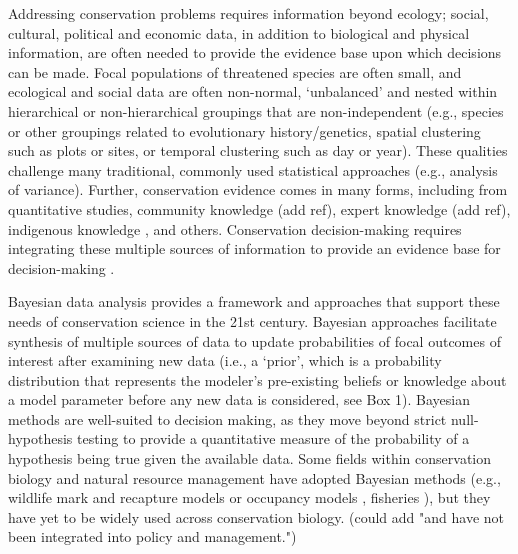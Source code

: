 \documentclass{article}
\begin{document}
\par Addressing conservation problems requires information beyond ecology; social, cultural, political and economic data, in addition to biological and physical information, are often needed to provide the evidence base upon which decisions can be made. Focal populations of threatened species are often small, and ecological and social data are often non-normal, `unbalanced' and nested within hierarchical or non-hierarchical groupings that are non-independent (e.g., species or other groupings related to evolutionary history/genetics, spatial clustering such as plots or sites, or temporal clustering such as day or year). These qualities challenge many traditional, commonly used statistical approaches (e.g., analysis of variance). Further, conservation evidence comes in many forms, including from quantitative studies, community knowledge (add ref), expert knowledge (add ref), indigenous knowledge \citep[e.g.,][]{gryba2023indigenous}, and others. Conservation decision-making requires integrating these multiple sources of information to provide an evidence base for decision-making \citep{stern2022interweaving}. 

\par Bayesian data analysis provides a framework and approaches that support these needs of conservation science in the 21st century. Bayesian approaches facilitate synthesis of multiple sources of data to update probabilities of focal outcomes of interest after examining new data (i.e., a `prior', which is a probability distribution that represents the modeler's pre-existing beliefs or knowledge about a model parameter before any new data is considered, see Box 1). Bayesian methods are well-suited to decision making, as they move beyond strict null-hypothesis testing to provide a quantitative measure of the probability of a hypothesis being true given the available data. Some fields within conservation biology and natural resource management have adopted Bayesian methods (e.g., wildlife mark and recapture models or occupancy models \citep{Kery2011}, fisheries \citep{Doll2018}), but they have yet to be widely used across conservation biology. (could add "and have not been integrated into policy and management.")
\end{document}
